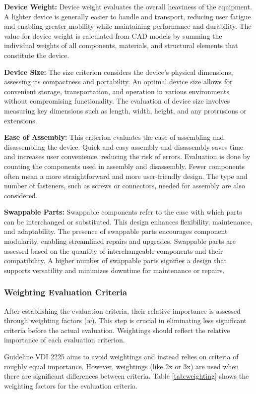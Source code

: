 \textbf{Device Weight:} Device weight evaluates the overall heaviness of the equipment. A lighter device is generally easier to handle and transport, reducing user fatigue and enabling greater mobility while maintaining performance and durability. The value for device weight is calculated from CAD models by summing the individual weights of all components, materials, and structural elements that constitute the device.

\textbf{Device Size:} The size criterion considers the device's physical dimensions, assessing its compactness and portability. An optimal device size allows for convenient storage, transportation, and operation in various environments without compromising functionality. The evaluation of device size involves measuring key dimensions such as length, width, height, and any protrusions or extensions.

\textbf{Ease of Assembly:} This criterion evaluates the ease of assembling and disassembling the device. Quick and easy assembly and disassembly saves time and increases user convenience, reducing the risk of errors. Evaluation is done by counting the components used in assembly and disassembly. Fewer components often mean a more straightforward and more user-friendly design. The type and number of fasteners, such as screws or connectors, needed for assembly are also considered.

\textbf{Swappable Parts:} Swappable components refer to the ease with which parts can be interchanged or substituted. This design enhances flexibility, maintenance, and adaptability. The presence of swappable parts encourages component modularity, enabling streamlined repairs and upgrades. Swappable parts are assessed based on the quantity of interchangeable components and their compatibility. A higher number of swappable parts signifies a design that supports versatility and minimizes downtime for maintenance or repairs.

\subsubsection{Weighting Evaluation Criteria}
After establishing the evaluation criteria, their relative importance is assessed through weighting factors ($w$). This step is crucial in eliminating less significant criteria before the actual evaluation. Weightings should reflect the relative importance of each evaluation criterion.

Guideline VDI 2225 aims to avoid weightings and instead relies on criteria of roughly equal importance. However, weightings (like 2x or 3x) are used when there are significant differences between criteria.
Table \ref{tab:weighting} shows the weighting factors for the evaluation criteria.

